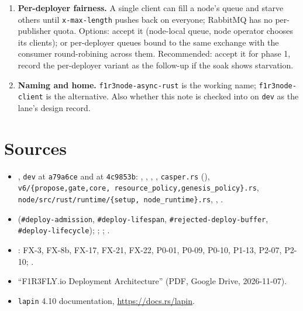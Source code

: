 \documentclass[11pt]{article}
\newcommand{\code}[1]{\texttt{#1}}
\newcommand{\dev}{\code{dev}}
\newcommand{\ote}{\path{feature/rev-stacks-ote}}
\begin{document}
\begin{enumerate}[leftmargin=2em]
  \item \textbf{Per-deployer fairness.} A single client can fill a node's queue and
    starve others until \code{x-max-length} pushes back on everyone; RabbitMQ has no
    per-publisher quota. Options: accept it (node-local queue, node operator chooses
    its clients); or per-deployer queues bound to the same exchange with the
    consumer round-robining across them. Recommended: accept it for phase 1, record
    the per-deployer variant as the follow-up if the soak shows starvation.
  \item \textbf{Naming and home.} \code{f1r3node-async-rust} is the working name;
    \code{f1r3node-client} is the alternative. Also whether this note is checked into
     on \dev{} as the lane's design record.
\end{enumerate}

\section*{Sources}
\begin{itemize}[leftmargin=2em]\small
  \item {}, \dev{} at \code{a79a6ce} and \ote{} at
    \code{4c9853b}: ,
    ,
    , ,
    \code{casper.rs} (), \code{v6/\{propose,gate,core,
    resource\_policy,genesis\_policy\}.rs}, \code{node/src/rust/runtime/\{setup,
    node\_runtime\}.rs}, ,
    .
  \item {} (\code{\#deploy-admission},
    \code{\#deploy-lifespan}, \code{\#rejected-deploy-buffer},
    \code{\#deploy-lifecycle}); ;
    ; .
  \item {}: FX-3, FX-8b, FX-17, FX-21, FX-22, P0-01,
    P0-09, P0-10, P1-13, P2-07, P2-10; .
  \item ``F1R3FLY.io Deployment Architecture'' (PDF, Google Drive, 2026-11-07).
  \item \code{lapin} 4.10 documentation, \url{https://docs.rs/lapin}.
\end{itemize}
\end{document}
